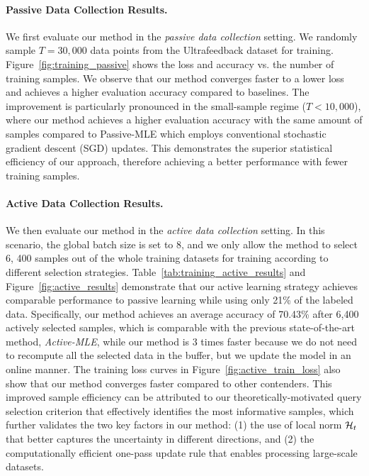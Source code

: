 \paragraph{Passive Data Collection Results.} 
We first evaluate our method in the \emph{passive data collection} setting. We randomly sample $T=30, 000$ data points from the Ultrafeedback dataset for training. Figure~\ref{fig:training_passive} shows the loss and accuracy vs. the number of training samples. We observe that our method converges faster to a lower loss and achieves a higher evaluation accuracy compared to baselines. The improvement is particularly pronounced in the small-sample regime ($T < 10, 000$), where our method achieves a higher evaluation accuracy with the same amount of samples compared to {Passive-MLE} which employs conventional stochastic gradient descent (SGD) updates. This demonstrates the superior statistical efficiency of our approach, therefore achieving a better performance with fewer training samples.

\paragraph{Active Data Collection Results.} We then evaluate our method in the \emph{active data collection} setting. In this scenario, the global batch size is set to 8, and we only allow the method to select 6, 400 samples out of the whole training datasets for training according to different selection strategies.
Table~\ref{tab:training_active_results} and Figure~\ref{fig:active_results} demonstrate that our active learning strategy achieves comparable performance to passive learning while using only 21\% of the labeled data. Specifically, our method achieves an average accuracy of 70.43\% after 6,400 actively selected samples, which is comparable with the previous state-of-the-art method, \emph{Active-MLE}, while our method is 3 times faster because we do not need to recompute all the selected data in the buffer, but we update the model in an online manner. The training loss curves in Figure~\ref{fig:active_train_loss} also show that our method converges faster compared to other contenders. This improved sample efficiency can be attributed to our theoretically-motivated query selection criterion that effectively identifies the most informative samples, which further validates the two key factors in our method: (1) the use of local norm $\mathcal{H}_t$ that better captures the uncertainty in different directions, and (2) the computationally efficient one-pass update rule that enables processing large-scale datasets.


